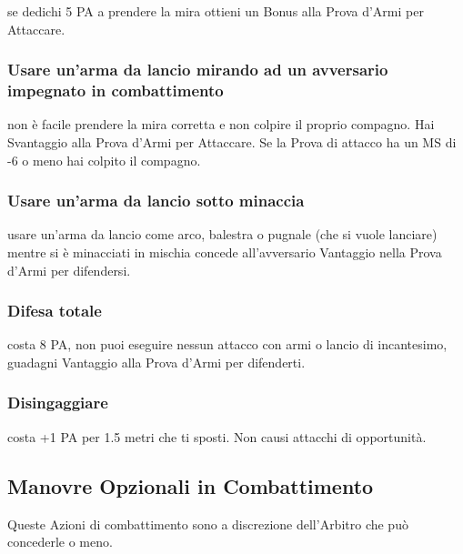 \documentclass[12pt,a4paper,twoside,openany]{book}
\begin{document}
\begin{multicols}{2}
se dedichi 5 PA a prendere la mira ottieni un Bonus alla Prova d'Armi per Attaccare.

\subsubsection{Usare un'arma da lancio mirando ad un avversario impegnato in combattimento} \label{usarearmalancioinmischia}

non è facile prendere la mira corretta e non colpire il proprio compagno. Hai Svantaggio alla Prova d'Armi per Attaccare. Se la Prova di attacco ha un MS di -6 o meno hai colpito il compagno.

\subsubsection{Usare un'arma da lancio sotto minaccia} \label{usarearmalanciosottominaccia}

usare un'arma da lancio come arco, balestra o pugnale (che si vuole lanciare) mentre si è minacciati in mischia concede all'avversario Vantaggio nella Prova d'Armi per difendersi.

\subsubsection{Difesa totale} \label{difesatotale}

costa 8 PA, non puoi eseguire nessun attacco con armi o lancio di incantesimo, guadagni Vantaggio alla Prova d'Armi per difenderti.

\subsubsection{Disingaggiare} \label{disingaggiare}

costa +1 PA per 1.5 metri che ti sposti. Non causi attacchi di opportunità.

\subsection{Manovre Opzionali in Combattimento}\label{azioniopzionaliincombattimento}

Queste Azioni di combattimento sono a discrezione dell'Arbitro che può concederle o meno.


\end{multicols}
\end{document}
